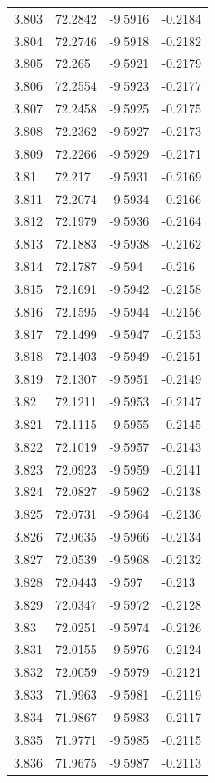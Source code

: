 \begin{tabular}{llll}
3.803 & 72.2842 & -9.5916 & -0.2184 \\
3.804 & 72.2746 & -9.5918 & -0.2182 \\
3.805 & 72.265 & -9.5921 & -0.2179 \\
3.806 & 72.2554 & -9.5923 & -0.2177 \\
3.807 & 72.2458 & -9.5925 & -0.2175 \\
3.808 & 72.2362 & -9.5927 & -0.2173 \\
3.809 & 72.2266 & -9.5929 & -0.2171 \\
3.81 & 72.217 & -9.5931 & -0.2169 \\
3.811 & 72.2074 & -9.5934 & -0.2166 \\
3.812 & 72.1979 & -9.5936 & -0.2164 \\
3.813 & 72.1883 & -9.5938 & -0.2162 \\
3.814 & 72.1787 & -9.594 & -0.216 \\
3.815 & 72.1691 & -9.5942 & -0.2158 \\
3.816 & 72.1595 & -9.5944 & -0.2156 \\
3.817 & 72.1499 & -9.5947 & -0.2153 \\
3.818 & 72.1403 & -9.5949 & -0.2151 \\
3.819 & 72.1307 & -9.5951 & -0.2149 \\
3.82 & 72.1211 & -9.5953 & -0.2147 \\
3.821 & 72.1115 & -9.5955 & -0.2145 \\
3.822 & 72.1019 & -9.5957 & -0.2143 \\
3.823 & 72.0923 & -9.5959 & -0.2141 \\
3.824 & 72.0827 & -9.5962 & -0.2138 \\
3.825 & 72.0731 & -9.5964 & -0.2136 \\
3.826 & 72.0635 & -9.5966 & -0.2134 \\
3.827 & 72.0539 & -9.5968 & -0.2132 \\
3.828 & 72.0443 & -9.597 & -0.213 \\
3.829 & 72.0347 & -9.5972 & -0.2128 \\
3.83 & 72.0251 & -9.5974 & -0.2126 \\
3.831 & 72.0155 & -9.5976 & -0.2124 \\
3.832 & 72.0059 & -9.5979 & -0.2121 \\
3.833 & 71.9963 & -9.5981 & -0.2119 \\
3.834 & 71.9867 & -9.5983 & -0.2117 \\
3.835 & 71.9771 & -9.5985 & -0.2115 \\
3.836 & 71.9675 & -9.5987 & -0.2113 \\

\end{tabular}
